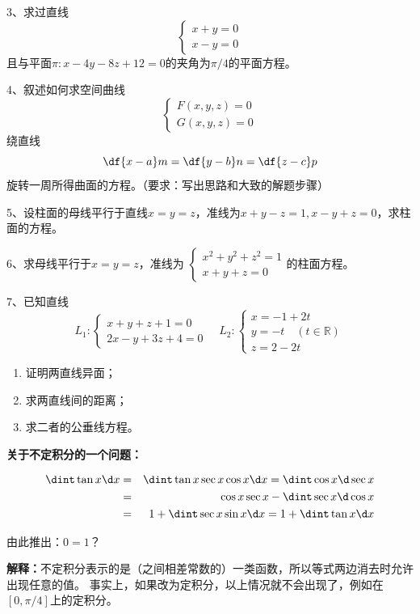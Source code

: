 3、求过直线
$$\left\{\begin{array}{l}
	x+y=0\\
	x-y=0
\end{array}\right.$$
且与平面$\pi:x-4y-8z+12=0$的夹角为$\pi/4$的平面方程。

4、叙述如何求空间曲线$$\left\{\begin{array}{l}
F(x,y,z)=0\\ G(x,y,z)=0
\end{array}\right.$$绕直线
$$\df{x-a}m=\df{y-b}n=\df{z-c}p$$
旋转一周所得曲面的方程。（要求：写出思路和大致的解题步骤）

5、设柱面的母线平行于直线$x=y=z$，准线为$x+y-z=1,x-y+z=0$，求柱面的方程。

6、求母线平行于$x=y=z$，准线为
$\left\{\begin{array}{l}
	x^2+y^2+z^2=1\\ x+y+z=0
\end{array}\right.$的柱面方程。

7、已知直线
$$L_1:\left\{\begin{array}{l}
	x+y+z+1=0\\
	2x-y+3z+4=0
\end{array}\right.
\quad
L_2:\left\{\begin{array}{l}
	x=-1+2t\\
	y=-t\quad(t\in\mathbb{R})\\
	z=2-2t
\end{array}\right.
$$
\begin{enumerate}[(1)]
  \setlength{\itemindent}{1cm}
  \item 证明两直线异面；
  \item 求两直线间的距离；
  \item 求二者的公垂线方程。
\end{enumerate}

\newpage

{\bf 关于不定积分的一个问题：}

\begin{eqnarray*}
	\dint\tan x\d x & = & \dint\tan x\sec x\cos x\d x=\dint\cos x\d\sec x\\
	& = & \cos x\sec x-\dint\sec x\d\cos x\\
	& = & 1+\dint\sec x\sin x\d x
	= 1+\dint\tan x\d x
\end{eqnarray*}

由此推出：$0=1$？

{\bf 解释：}不定积分表示的是（之间相差常数的）一类函数，所以等式两边消去时允许出现任意的值。
事实上，如果改为定积分，以上情况就不会出现了，例如在$[0,\pi/4]$上的定积分。

